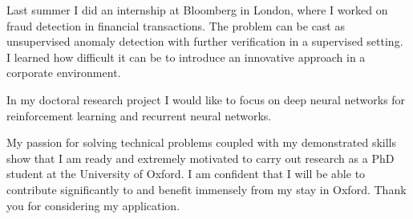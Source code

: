\documentclass[12pt]{article}
\begin{document}
Last summer I did an internship at Bloomberg in London, where I worked on fraud detection in financial transactions. The problem can be cast as unsupervised anomaly detection with further verification in a supervised setting. I learned how difficult it can be to introduce an innovative approach in a corporate environment.

In my doctoral research project I would like to focus on deep neural networks for reinforcement learning and recurrent neural networks. 

My passion for solving technical problems coupled with my demonstrated skills show that I am ready and extremely motivated to carry out research as a PhD student at the University of Oxford. I am confident that I will be able to contribute significantly to and benefit immensely from my stay in Oxford. Thank you for considering my application.



\end{document}
